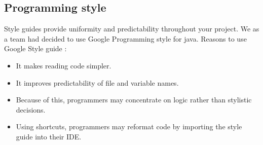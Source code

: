 \documentclass[
	12pt
]{article}
\begin{document}
\subsection{Programming style}
Style guides provide uniformity and predictability throughout your project\cite{styleguide}.
We as a team had decided to use Google Programming style for java. 
Reasons to use Google Style guide :
\begin{itemize}
    \item It makes reading code simpler.
    \item It improves predictability of file and variable names.
    \item Because of this, programmers may concentrate on logic rather than stylistic decisions.
    \item Using shortcuts, programmers may reformat code by importing the style guide into their IDE\cite{googlestyleguide}.
\end{itemize}
\end{document}
